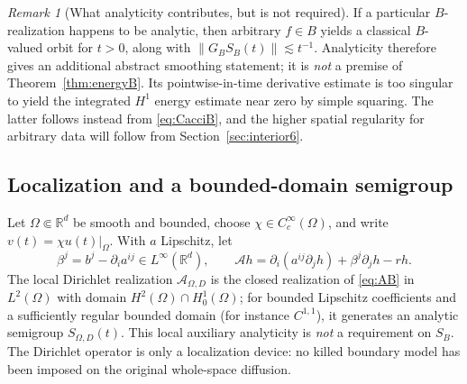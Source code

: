 \documentclass[11pt,a4paper]{article}
\theoremstyle{definition}\newtheorem{definition}{Definition}[section]\newtheorem{example}[theorem]{Example}
\theoremstyle{remark}\newtheorem{remark}[theorem]{Remark}\newtheorem{remarkSix}{Remark}[section]
\newcommand{\Rd}{\mathbb R^d}
\newcommand{\Cc}{C_c^\infty}
\newcommand{\norm}[1]{\lVert #1\rVert}
\newcommand{\cA}{\mathcal A}
\begin{document}
\begin{remark}[What analyticity contributes, but is not required]\label{rem:energygapB}
If a particular $B$-realization happens to be analytic, then arbitrary $f\in B$ yields a classical $B$-valued orbit for $t>0$, along with $\norm{G_BS_B(t)}\lesssim t^{-1}$. Analyticity therefore gives an additional abstract smoothing statement; it is \emph{not} a premise of Theorem~\ref{thm:energyB}. Its pointwise-in-time derivative estimate is too singular to yield the integrated $H^1$ energy estimate near zero by simple squaring. The latter follows instead from \eqref{eq:CacciB}, and the higher spatial regularity for arbitrary data will follow from Section~\ref{sec:interior6}.
\end{remark}

\subsection{Localization and a bounded-domain semigroup}
\label{subsec:localduhamelB}
Let $\Omega\Subset\Rd$ be smooth and bounded, choose $\chi\in\Cc(\Omega)$, and write $v(t)=\chi u(t)|_\Omega$. With $a$ Lipschitz, let
\begin{equation}\label{eq:betaB}
 \beta^j=b^j-\partial_i a^{ij}\in L^\infty(\Rd),\qquad
 \cA h=\partial_i(a^{ij}\partial_jh)+\beta^j\partial_jh-rh.
\end{equation}
The local Dirichlet realization $\cA_{\Omega,D}$ is the closed realization of \eqref{eq:AB} in $L^2(\Omega)$ with domain $H^2(\Omega)\cap H^1_0(\Omega)$; for bounded Lipschitz coefficients and a sufficiently regular bounded domain (for instance $C^{1,1}$), it generates an analytic semigroup $S_{\Omega,D}(t)$. This local auxiliary analyticity is \emph{not} a requirement on $S_B$. The Dirichlet operator is only a localization device: no killed boundary model has been imposed on the original whole-space diffusion.
\end{document}
